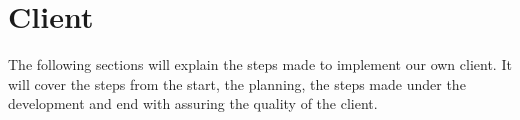 \section{Client}
The following sections will explain the steps made to implement our own client. It will cover the steps from the start, the planning, the steps made under the development and end with assuring the quality of the client.




